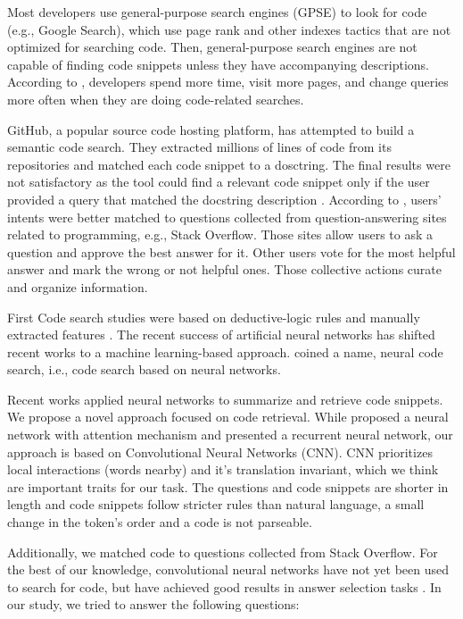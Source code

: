 \documentclass[sigconf]{acmart}
\begin{document}
Most developers use general-purpose search engines (GPSE) to look for code (e.g., Google Search), which use page rank and other indexes tactics that are not optimized for searching code. Then, general-purpose search engines are not capable of finding code snippets unless they have accompanying descriptions. According to \citet{masudur-developers-use-google-code-retrieval:2018}, developers spend more time, visit more pages, and change queries more often when they are doing code-related searches.

GitHub, a popular source code hosting platform, has attempted to build a semantic code search. They extracted millions of lines of code from its repositories and matched each code snippet to a dosctring. The final results were not satisfactory as the tool could find a relevant code snippet only if the user provided a query that matched the docstring description \citep{husain-github-semantic-search-code-2019}. According to \citet{cambronero-deep-code-search-2019}, users' intents were better matched to questions collected from question-answering sites related to programming, e.g., Stack Overflow. Those sites allow users to ask a question and approve the best answer for it. Other users vote for the most helpful answer and mark the wrong or not helpful ones. Those collective actions curate and organize information.

First Code search studies were based on deductive-logic rules and manually extracted features \cite{Allamanis:2018:SML}. The recent success of artificial neural networks has shifted recent works to a machine learning-based approach. \citet{cambronero-deep-code-search-2019} coined a name, neural code search, i.e., code search based on neural networks.

Recent works applied neural networks to summarize and retrieve code snippets. We propose a novel approach focused on code retrieval. While \citet{cambronero-deep-code-search-2019} proposed a neural network with attention mechanism and \citet{Gu-deep-code-search:2018} presented a recurrent neural network, our approach is based on Convolutional Neural Networks (CNN).  CNN prioritizes local interactions (words nearby) and it's translation invariant, which we think are important traits for our task. The questions and code snippets are shorter in length and code snippets follow stricter rules than natural language, a small change in the token's order and a code is not parseable. 

Additionally, we matched code to questions collected from Stack Overflow. For the best of our knowledge, convolutional neural networks have not yet been used to search for code, but have achieved good results in answer selection tasks \citep{feng-2015, wen-joint-modeling-question-answer-2019}. In our study, we tried to answer the following questions:
\end{document}
